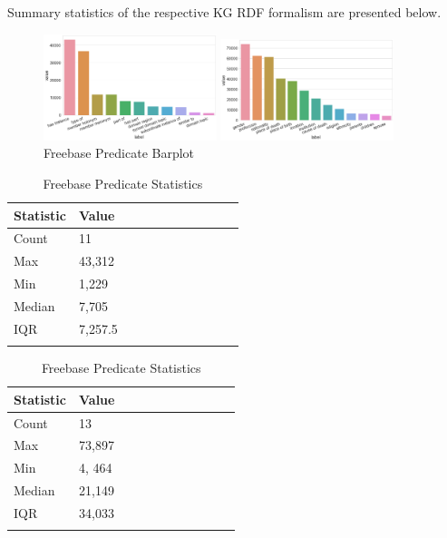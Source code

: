 \noindent Summary statistics of the respective KG RDF formalism are presented below.

\medskip

\begin{figure}[H]
	\parbox{.5\linewidth}{
   		\centering
    		\includegraphics[width=0.45\textwidth, height=0.2\textheight]{Wordnet_Predicate_Counts}
		\caption{Wordnet Predicate Barplot}
		}
	\hfill
	\parbox{.5\linewidth}{
   		\centering
		\includegraphics[width=0.45\textwidth, height=0.2\textheight]{Freebase_Predicate_Counts}
		\caption{Freebase Predicate Barplot}
		}
\end{figure}

\begin{table}[H]
	\parbox{.5\linewidth}{
		\centering
		\begin{tabular}{lllllllllll}
  			\textbf{Statistic} & \textbf{Value}  \\
  			\hline
			Count & 11 \\
			Max & 43,312  \\
			Min & 1,229  \\
  			Median & 7,705  \\
  			IQR & 7,257.5  \\
				&
		\end{tabular}
		\caption{Wordnet Predicate Statistics}
		}
	\hfill
	\parbox{.5\linewidth}{
		\centering
		\begin{tabular}{lllllllllll}
  			\textbf{Statistic} & \textbf{Value}  \\
  			\hline
			Count & 13 \\
			Max & 73,897  \\
			Min & 4, 464  \\
  			Median & 21,149  \\
  			IQR & 34,033  \\
				&
		\end{tabular} 
		\caption{Freebase Predicate Statistics}
		}
\end{table}

